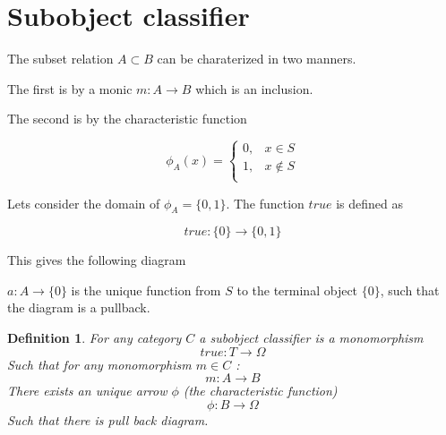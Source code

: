 \documentclass[twoside]{article}
\newtheorem{definition}[theorem]{Definition}
\begin{document}
\section{Subobject classifier}

The subset relation $A \subset B$ can be
charaterized in two manners.

The first is by a monic $m : A \rightarrow B$ which is
an inclusion.

The second is by the characteristic function

$$\phi_A(x) =
  \begin{cases}
    0, & x \in S \\
    1, & x \notin S \\
  \end{cases}$$

Lets consider the domain of $\phi_A = \{0,1\}$.  The function
$true$ is defined as

$$true : \{ 0 \} \rightarrow \{ 0, 1 \} $$

This gives the following diagram

\begin{figure}[H]
       \centering
{}
\end{figure}

$a : A \rightarrow \{ 0 \} $ is the unique function from $S$
to the terminal object $\{ 0 \}$, such that the diagram is a pullback.


\begin{definition}
For any category $C$ a subobject classifier is a monomorphism
$$true : T \rightarrow \Omega $$
Such that for any monomorphism $m \in C$ :
$$ m : A \rightarrow B $$
There exists an unique arrow $\phi$ (the characteristic function)
$$\phi : B \rightarrow \Omega $$
Such that there is pull back diagram.\\

\begin{figure}[H]
       \centering
{}
\end{figure}
\end{definition}




\end{document}
